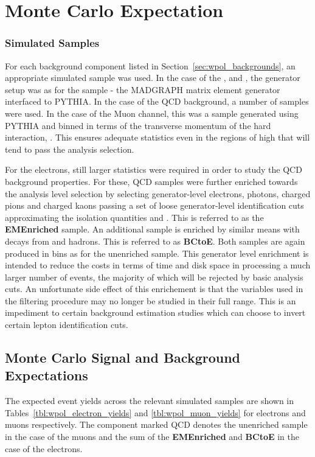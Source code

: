 \section{Monte Carlo Expectation}
\subsubsection{Simulated Samples}
For each background component listed in Section~\ref{sec:wpol_backgrounds}, an
appropriate simulated sample was used. In the case of the \Zjets, \ttbar and
\gammajets, the generator setup was as for the \Wjets sample - the \ac{MADGRAPH}
matrix element generator interfaced to \ac{PYTHIA}. In the case of the \ac{QCD}
background, a number of samples were used. In the case of the Muon channel, this
was a sample generated using \ac{PYTHIA} and binned in terms of the transverse
momentum of the hard interaction, \pthat. This ensures adequate statistics even
in the regions of high \pthat that will tend to pass the analysis selection.

For the electrons, still larger statistics were required in order to study the
\ac{QCD} background properties. For these, \ac{QCD} samples were further
enriched towards the analysis level selection by selecting generator-level
electrons, photons, charged pions and charged kaons passing a set of loose
generator-level identification cuts approximating the isolation quantities and
\HoverE. This is referred to as the \textbf{EMEnriched} sample. An additional
sample is enriched by similar means with decays from \Pbottom and \Pstrange
hadrons. This is referred to as \textbf{BCtoE}. Both samples are again produced
in \pthat bins as for the unenriched sample. This generator level enrichment is
intended to reduce the costs in terms of time and disk space in processing a
much larger number of events, the majority of which will be rejected by basic
analysis cuts. An unfortunate side effect of this enrichement is that the
variables used in the filtering procedure may no longer be studied in their full
range. This is an impediment to certain background estimation studies which can
choose to invert certain lepton identification cuts.

\subsection{Monte Carlo Signal and Background Expectations}
\label{sec:wpol_yields}
The expected event yields across the relevant simulated samples are shown in
Tables~\ref{tbl:wpol_electron_yields} and \ref{tbl:wpol_muon_yields} for
electrons and muons respectively. The component marked \ac{QCD} denotes the
unenriched sample in the case of the muons and the sum of the
\textbf{EMEnriched} and \textbf{BCtoE} in the case of the electrons.

